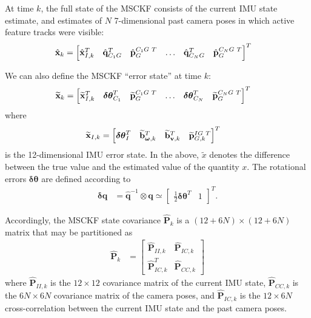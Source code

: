 \documentclass[letterpaper, 10 pt, conference]{ieeeconf}  %
\def\Vec#1{\mathbf{#1}}
\newcommand{\bbm}{\begin{bmatrix}}
\newcommand{\ebm}{\end{bmatrix}}
\begin{document}
At time $k$, the full state of the MSCKF consists of the current IMU state estimate, and estimates of $N$ 7-dimensional past camera poses in which active feature tracks were visible:
\begin{align}
    \hat{\Vec{x}}_k &= \bbm \hat{\Vec{x}}_{I,k}^T & \hat{\Vec{q}}_{C_1 G}^T & \hat{\Vec{p}}_G^{C_1 G \hspace{0.3em} T} & \hdots & \hat{\Vec{q}}_{C_N G}^T & \hat{\Vec{p}}_G^{C_N G \hspace{0.3em} T} \ebm ^T
\end{align}

We can also define the MSCKF ``error state'' at time $k$:
\begin{align}
    \widetilde{\Vec{x}}_k &= \bbm \widetilde{\Vec{x}}_{I,k}^T & \boldsymbol{\delta\theta}_{C_1}^T & \widetilde{\Vec{p}}_G^{C_1 G \hspace{0.3em} T} & \hdots & \boldsymbol{\delta\theta}_{C_N}^T & \widetilde{\Vec{p}}_G^{C_N G \hspace{0.3em} T} \ebm ^T
\end{align}
where
\begin{align}
    \widetilde{\Vec{x}}_{I,k} &= \bbm \boldsymbol{\delta\theta}_I^T & \widetilde{\Vec{b}}_{\boldsymbol{\omega},k}^T & \widetilde{\Vec{b}}_{\Vec{v},k}^T & \widetilde{\Vec{p}}_{G,k}^{IG \hspace{0.3em} T} \ebm^T
\end{align}
is the 12-dimensional IMU error state.
In the above, $\widetilde{x}$ denotes the difference between the true value and the estimated value of the quantity $x$.
The rotational errors $\boldsymbol{\delta\theta}$ are defined according to
\begin{align}
    \boldsymbol{\delta}\Vec{q} &= \hat{\Vec{q}}^{-1} \otimes \Vec{q} \simeq \bbm \frac{1}{2}\boldsymbol{\delta\theta}^T & 1 \ebm^T.
\end{align}

Accordingly, the MSCKF state covariance $\hat{\Vec{P}}_k$ is a $(12+6N)\times(12+6N)$ matrix that may be partitioned as
\begin{align} \label{eq:covariance}
    \hat{\Vec{P}}_k &= \bbm \hat{\Vec{P}}_{II,k} & \hat{\Vec{P}}_{IC,k} \\ \hat{\Vec{P}}_{IC,k}^T & \hat{\Vec{P}}_{CC,k} \ebm
\end{align}
where $\hat{\Vec{P}}_{II,k}$ is the $12\times12$ covariance matrix of the current IMU state, $\hat{\Vec{P}}_{CC,k}$ is the $6N\times6N$ covariance matrix of the camera poses, and $\hat{\Vec{P}}_{IC,k}$ is the $12\times6N$ cross-correlation between the current IMU state and the past camera poses.
\end{document}

